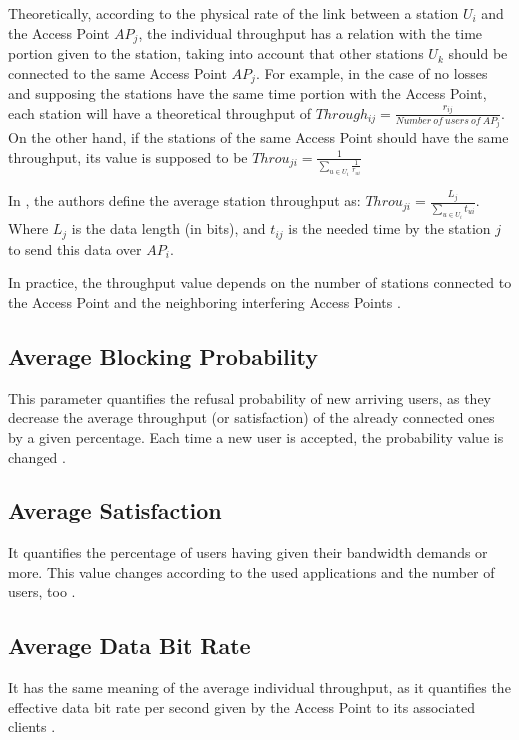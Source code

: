 \documentclass[journal,transmag]{IEEEtran}
\begin{document}
Theoretically, according to the physical rate of the link between a station $U_i$ and the Access Point $AP_j$, the individual throughput has a relation with the time portion given to the station, taking into account that other stations $U_k$ should be connected to the same Access Point $AP_j$. For example, in the case of no losses and supposing the stations have the same time portion with the Access Point, each station will have a theoretical throughput of $Through_{ij}=\frac{r_{ij}}{Number \ of \ users \ of \ AP_j}$. On the other hand, if the stations of the same Access Point should have the same throughput, its value is supposed to be $Throu_{ji}= \frac{1}{\sum\limits_{u \in U_i} \frac{1}{r_{ui}}}$

In \cite{07optimal_association_MSWIM}, the authors define the average station throughput as: 
$Throu_{ji}= \frac{L_j}{\sum\limits_{u \in U_i} t_{ui}}$. Where $L_j$ is the data length (in bits), and $t_{ij}$ is the needed time by the station $j$ to send this data over $AP_i$.

In practice, the throughput value depends on the number of stations connected to the Access Point and the neighboring interfering Access Points \cite{16AP_association_optimisation_fairness}.   

\subsection{Average Blocking Probability} This parameter quantifies the refusal probability of new arriving users, as they decrease the average throughput (or satisfaction) of the already connected ones by a given percentage. Each time a new user is accepted, the probability value is changed \cite{17QOS_AP_selection}.   

\subsection{Average Satisfaction} It quantifies the percentage of users having given their bandwidth demands or more. This value changes according to the used applications and the number of users, too \cite{17QOS_AP_selection}.   

\subsection{Average Data Bit Rate} It has the same meaning of the average individual throughput, as it quantifies the effective data bit rate per second given by the Access Point to its associated clients \cite{17QOS_AP_selection}. 
\end{document}
